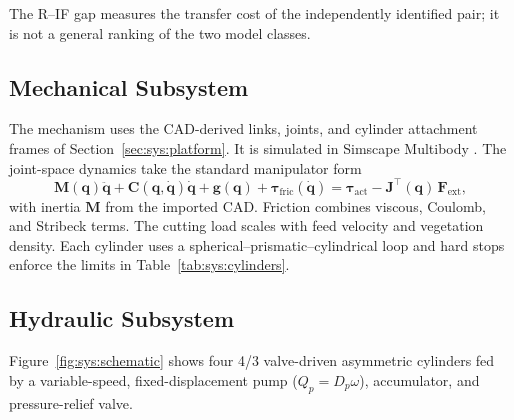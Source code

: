 The R--IF gap measures the transfer cost of the independently identified pair;
it is not a general ranking of the two model classes.

\subsection{Mechanical Subsystem}

The mechanism uses the CAD-derived links, joints, and cylinder attachment
frames of Section~\ref{sec:sys:platform}. It is simulated in Simscape
Multibody \cite{mathworks2024simscapemultibody}. The joint-space dynamics take
the standard manipulator form~\cite{siciliano2009robotics}
%
\begin{equation}
  \label{eq:sys:eom}
  \bm{M}(\bm{q})\ddot{\bm{q}}
  + \bm{C}(\bm{q},\dot{\bm{q}})\dot{\bm{q}}
  + \bm{g}(\bm{q})
  + \bm{\tau}_{\mathrm{fric}}(\dot{\bm{q}})
  = \bm{\tau}_{\mathrm{act}} - \bm{J}^{\top}(\bm{q})\,\bm{F}_{\mathrm{ext}},
\end{equation}
%
with inertia $\bm{M}$ from the imported CAD. Friction combines viscous,
Coulomb, and Stribeck terms. The cutting load scales with feed velocity and
vegetation density. Each cylinder uses a
spherical--prismatic--cylindrical loop and hard stops enforce the limits in
Table~\ref{tab:sys:cylinders}.

\subsection{Hydraulic Subsystem}

Figure~\ref{fig:sys:schematic} shows four 4/3 valve-driven asymmetric cylinders
fed by a variable-speed, fixed-displacement pump
($Q_p=D_p\omega$), accumulator, and pressure-relief valve.

